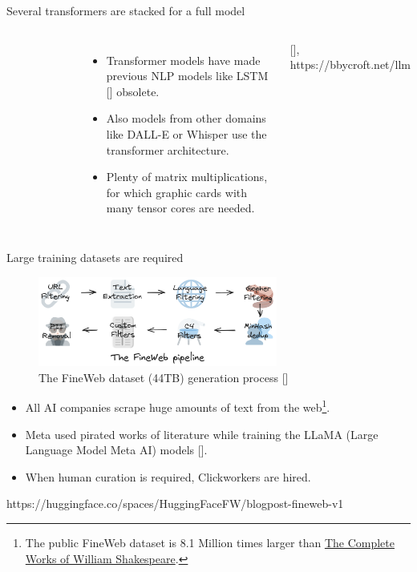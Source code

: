 \documentclass[10pt]{beamer}
\newcommand{\credit}[1]{{\par \raggedleft \scriptsize \mdseries \color{mDarkBrown} #1 \par}}
\newcommand{\creditleft}[1]{{\par \raggedright \scriptsize \mdseries \color{mDarkBrown} #1 \par}}
\newcommand{\citeme}[1]{{\xspace\color{scAqua} \scriptsize [\cite{#1}]}}
\begin{document}
\begin{frame}{Several transformers are stacked for a full model}
\begin{columns}[T,onlytextwidth]
\begin{figure}
		\end{figure}
		\vspace{1cm}
		\begin{itemize}
			\item Transformer models have made previous NLP models like LSTM\citeme{Hochreiter1997} obsolete.
			\item Also models from other domains like DALL-E or Whisper use the transformer architecture.
			\item Plenty of matrix multiplications, for which graphic cards with many tensor cores are needed.
		\end{itemize}	
		\vspace{1.5cm} \par
		\creditleft{\citeme{Bycroft2023}, https://bbycroft.net/llm}
	\end{columns}
\end{frame}

\begin{frame}{Large training datasets are required}
	\begin{figure}
		\includegraphics[width=0.7\textwidth]{figures/dist_assets_images_fineweb-recipe.png}
		\caption{The FineWeb dataset (44TB) generation process\citeme{Penedo2024}}
	\end{figure}
	\begin{itemize}
		\item All AI companies scrape huge amounts of text from the web\footnote{\tiny The public FineWeb dataset is 8.1 Million times larger than \href{https://www.gutenberg.org/ebooks/100}{The Complete Works of William Shakespeare}.}.
		\item Meta used pirated works of literature while training the LLaMA (Large Language Model Meta AI) models\citeme{Belanger2025}.
		\item When human curation is required, Clickworkers are hired.
	\end{itemize}
	\credit{https://huggingface.co/spaces/HuggingFaceFW/blogpost-fineweb-v1\par \vspace{0.2cm} \hfill}
\end{frame}
\end{document}
